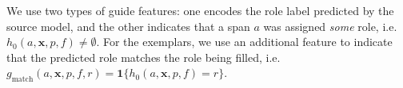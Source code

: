 \documentclass[11pt,a4paper]{article}
\newcommand{\exemplars}{\mathrm{ex}}
\newcommand{\fulltext}{\mathrm{ft}}
\newcommand{\ensuretext}[1]{#1}
\newcommand{\nssmarker}{\ensuretext{\textcolor{magenta}{\ensuremath{^{\textsc{NS}}_{\textsc{S}}}}}}
\newcommand{\mkmarker}{\ensuretext{\textcolor{red}{\ensuremath{^{\textsc{M}}_{\textsc{K}}}}}}
\newcommand{\stmarker}{\ensuretext{\textcolor{orange}{\ensuremath{^{\textsc{S}}_{\textsc{T}}}}}}
\newcommand{\arkcomment}[3]{\ensuretext{\textcolor{#3}{[#1 #2]}}}
\newcommand{\nss}[1]{\arkcomment{\nssmarker}{#1}{magenta}}
\newcommand{\mk}[1]{\arkcomment{\mkmarker}{#1}{red}}
\newcommand{\st}[1]{\arkcomment{\stmarker}{#1}{orange}}
\newcommand{\x}{\mathbf{x}}
\begin{document}
We use two types of guide features:
one encodes the role label predicted by the source model,
and the other indicates that a span $a$ was assigned \emph{some} role, 
i.e.~$h_0(a,\mathbf{x},p,f)\neq\emptyset$.
For the exemplars, %
we use an additional feature to indicate that 
the predicted role matches the role being filled, 
i.e.~$g_{\text{match}}(a,\mathbf{x},p,f,r) = \mathbf{1}\{h_0(a,\mathbf{x},p,f)=r\}$.


% 
% 
\end{document}

